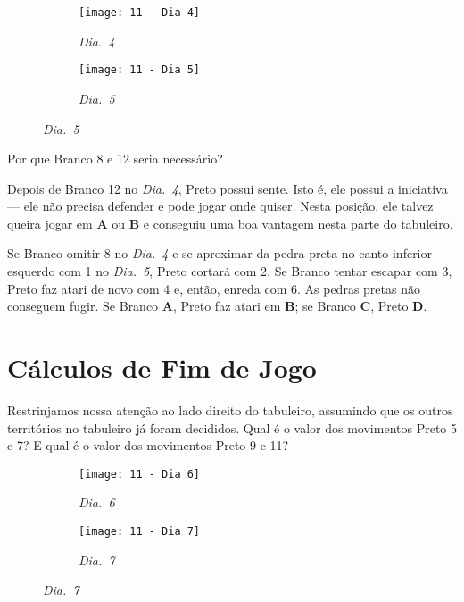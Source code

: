 \begin{figure}[h!]
    \centering
    \begin{subfigure}[t]{.45\textwidth}
        \texttt{[image: 11 - Dia 4]}
        \caption*{\emph{Dia.\@~4}}
    \end{subfigure}
    \hspace{1cm}
    \begin{subfigure}[t]{.45\textwidth}
        \texttt{[image: 11 - Dia 5]}
        \caption*{\emph{Dia.\@~5}}
    \end{subfigure}
\end{figure}

Por que Branco 8 e 12 seria necessário?

Depois de Branco 12 no \emph{Dia.\@~4}, Preto possui sente. Isto é, ele possui a iniciativa --- ele não precisa defender e pode jogar onde quiser. Nesta posição, ele talvez queira jogar em \textbf{A} ou \textbf{B} e conseguiu uma boa vantagem nesta parte do tabuleiro.

Se Branco omitir 8 no \emph{Dia.\@~4} e se aproximar da pedra preta no canto inferior esquerdo com 1 no \emph{Dia.\@~5}, Preto cortará com 2. Se Branco tentar escapar com 3, Preto faz atari de novo com 4 e, então, enreda com 6. As pedras pretas não conseguem fugir. Se Branco \textbf{A}, Preto faz atari em \textbf{B}; se Branco \textbf{C}, Preto \textbf{D}.

\pagebreak

\section{Cálculos de Fim de Jogo}

Restrinjamos nossa atenção ao lado direito do tabuleiro, assumindo que os outros territórios no tabuleiro já foram decididos. Qual é o valor dos movimentos Preto 5 e 7? E qual é o valor dos movimentos Preto 9 e 11?

\begin{figure}[h!]
    \centering
    \begin{subfigure}[t]{.45\textwidth}
        \texttt{[image: 11 - Dia 6]}
        \caption*{\emph{Dia.\@~6}}
    \end{subfigure}
    \hspace{1cm}
    \begin{subfigure}[t]{.45\textwidth}
        \texttt{[image: 11 - Dia 7]}
        \caption*{\emph{Dia.\@~7}}
    \end{subfigure}
\end{figure}

